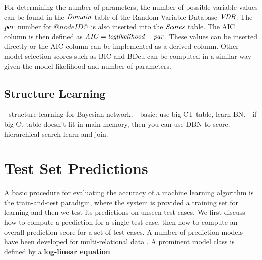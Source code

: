 \documentclass{acm_proc_article-sp}
\newcommand{\ct}{\mathit{ct}}
\begin{document}

For determining the number of parameters, the number of possible variable values can be found in the $\it{Domain}$ table of the Random Variable Database $\it{VDB}$.  The $\mathit{par}$ number for $@nodeID@$ is also inserted into the $\it{Scores}$ table. The AIC column is then defined as $\mathit{AIC} = \it{loglikelihood} - \mathit{par}$. These values can be inserted directly or the AIC column can be implemented as a derived column. %
%
Other model selection scores such as BIC and BDeu can be computed in a similar way given the model likelihood and number of parameters.

\subsection{Structure Learning}
 


- structure learning for Bayesian network. 
- basic: use big CT-table, learn BN.
- if big Ct-table doesn't fit in main memory, then you can use DBN to score.
- hierarchical search learn-and-join.



\section{Test Set Predictions}

A basic procedure for evaluating the accuracy of a machine learning algorithm is the train-and-test paradigm, where the system is provided a training set for learning and then we test its predictions on unseen test cases. %
%
We first discuss how to compute a prediction for a single test case, then how to compute an overall prediction score for a set of test cases. A number of prediction models have been developed for multi-relational data \cite{Dzeroski2003}. A prominent model class is defined by a \textbf{log-linear equation}
\end{document}
